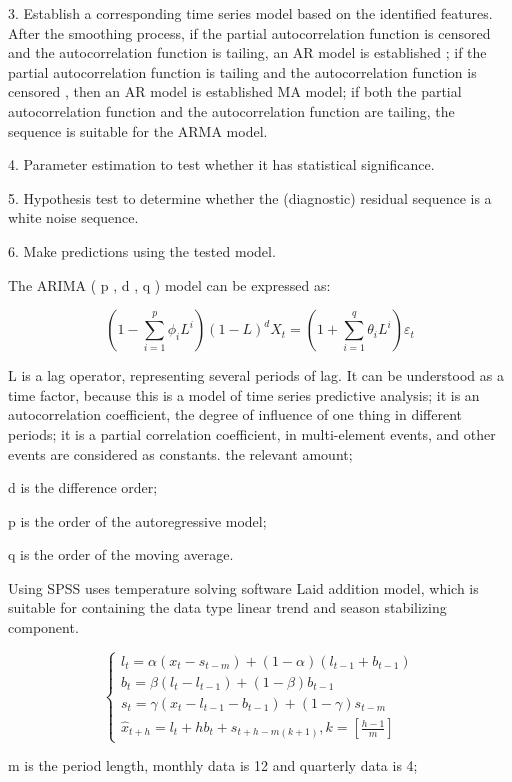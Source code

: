 \documentclass{mcmthesis}
\begin{document}
3. Establish a corresponding time series model based on the identified features. After the smoothing process, if the partial autocorrelation function is censored and the autocorrelation function is tailing, an AR model is established ; if the partial autocorrelation function is tailing and the autocorrelation function is censored , then an AR model is established MA model; if both the partial autocorrelation function and the autocorrelation function are tailing, the sequence is suitable for the ARMA model.

4. Parameter estimation to test whether it has statistical significance.

5. Hypothesis test to determine whether the (diagnostic) residual sequence is a white noise sequence.

6. Make predictions using the tested model.

The ARIMA ( p , d , q ) model can be expressed as:

\[
\left(1-\sum_{i=1}^{p} \phi_{i} L^{i}\right)(1-L)^{d} X_{t}=\left(1+\sum_{i=1}^{q} \theta_{i} L^{i}\right) \varepsilon_{t}
\]

L is a lag operator, representing several periods of lag. It can be understood as a time factor, because this is a model of time series predictive analysis; it is an autocorrelation coefficient, the degree of influence of one thing in different periods; it is a partial correlation coefficient, in multi-element events, and other events are considered as constants. the relevant amount;

d is the difference order;

p is the order of the autoregressive model;

q is the order of the moving average.

Using SPSS uses temperature solving software Laid addition model, which is suitable for containing the data type linear trend and season stabilizing component.

\[
\left\{\begin{array}{l}
{l_{t}=\alpha\left(x_{t}-s_{t-m}\right)+(1-\alpha)\left(l_{t-1}+b_{t-1}\right)} \\
{b_{t}=\beta\left(l_{t}-l_{t-1}\right)+(1-\beta) b_{t-1}} \\
{s_{t}=\gamma\left(x_{t}-l_{t-1}-b_{t-1}\right)+(1-\gamma) s_{t-m}} \\
{\hat{x}_{t+h}=l_{t}+h b_{t}+s_{t+h-m(k+1)}, k=\left[\frac{h-1}{m}\right]}
\end{array}\right.
\]

m is the period length, monthly data is 12 and quarterly data is 4;
\end{document}

